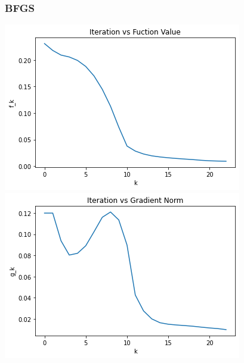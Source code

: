 \documentclass[11pt,letterpaper]{article}
\theoremstyle{definition}
\theoremstyle{definition}
\theoremstyle{definition}
\begin{document}
\subsubsection{BFGS}
\begin{center}
	\includegraphics[width=0.7\linewidth]{graficas/bfgs_f_5}
	\includegraphics[width=0.7\linewidth]{graficas/bfgs_g_5}
\end{center}
\end{document}
